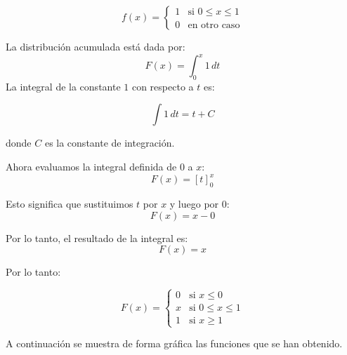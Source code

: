 $$f(x) =
\begin{cases} 
1 & \text{si } 0 \leq x \leq 1 \\
0 & \text{en otro caso}  
\end{cases}$$
        
La distribución acumulada está dada por:
$$F(x)=\int_{0}^{x} 1 \, dt$$
La integral de la constante $1$ con respecto a $t$ es:

$$\int 1 \, dt = t + C$$

donde $C$ es la constante de integración.

Ahora evaluamos la integral definida de $0$ a $x$:
$$F(x) = \left[ t \right]_{0}^{x}$$

Esto significa que sustituimos $t$ por $x$ y luego por $0$:
$$F(x) = x - 0$$

Por lo tanto, el resultado de la integral es:
$$F(x) = x$$

Por lo tanto:

$$F(x) =
\begin{cases} 
0 & \text{si } x \leq 0\\
x & \text{si } 0 \leq x \leq 1 \\
1 & \text{si } x \geq 1  
\end{cases}$$

A continuación se muestra de forma gráfica las funciones que se han obtenido.


